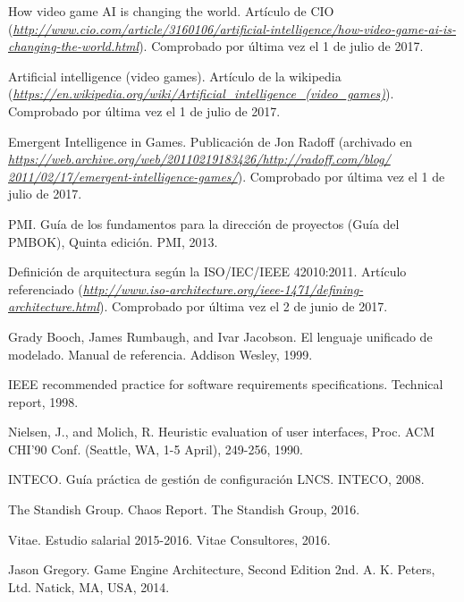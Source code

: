 

\begin{thebibliography}{99}
	
 How video game AI is changing the world. Artículo de CIO ({\it \url{http://www.cio.com/article/3160106/artificial-intelligence/how-video-game-ai-is-changing-the-world.html}}). Comprobado por última vez el 1 de julio de 2017.

 Artificial intelligence (video games). Artículo de la wikipedia (\textit{\url{https://en.wikipedia.org/wiki/Artificial\_intelligence\_(video\_games)}}). Comprobado por última vez el 1 de julio de 2017.
	
Emergent Intelligence in Games. Publicación de Jon Radoff (archivado en \textit{\href{https://web.archive.org/web/20110219183426/http://radoff.com/blog/2011/02/17/emergent-intelligence-games/}{https://web.archive.org/web/20110219183426/http://radoff.com/blog/\\2011/02/17/emergent-intelligence-games/}}).  Comprobado por última vez el 1 de julio de 2017.
	
PMI. Guía de los fundamentos para la dirección de proyectos (Guía del PMBOK), Quinta edición. PMI, 2013. 	
	
 Definición de arquitectura según la ISO/IEC/IEEE 42010:2011. Artículo referenciado ({\it \url{http://www.iso-architecture.org/ieee-1471/defining-architecture.html}}). Comprobado por última vez el 2 de junio de 2017.

Grady Booch, James Rumbaugh, and Ivar Jacobson. El lenguaje unificado de modelado. Manual
de referencia. Addison Wesley, 1999.

IEEE recommended practice for software requirements specifications. Technical report, 1998.

Nielsen, J., and Molich, R. Heuristic evaluation of user interfaces, Proc. ACM CHI'90 Conf. (Seattle, WA, 1-5 April), 249-256, 1990.

INTECO. Guía práctica de gestión de configuración LNCS. INTECO, 2008.

The Standish Group. Chaos Report. The Standish Group, 2016.

Vitae. Estudio salarial 2015-2016. Vitae Consultores, 2016.

Jason Gregory. Game Engine Architecture, Second Edition 2nd. A. K. Peters, Ltd. Natick, MA, USA, 2014.


\end{thebibliography}
